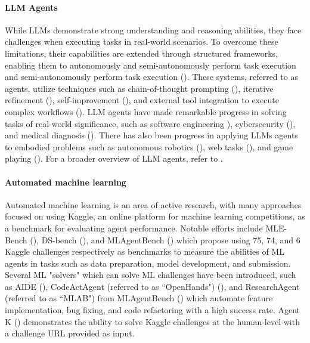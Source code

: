 \documentclass[11pt, a4paper]{gdm_format}
\begin{document}
\paragraph{LLM Agents}
While LLMs demonstrate strong understanding and reasoning abilities, they face challenges when executing tasks in real-world scenarios.
To overcome these limitations, their capabilities are extended through structured frameworks, enabling them to autonomously and semi-autonomously perform task execution and semi-autonomously perform task execution (\cite{wu2023autogen, li2023camel, chen2023agentverse, qian2024chatdev}).
These systems, referred to as agents, utilize techniques such as chain-of-thought prompting (\cite{wei2022chain}), iterative refinement (\cite{shinn2024reflexion}), self-improvement (\cite{huang2022large}), and external tool integration to execute complex workflows (\cite{hao2024toolkengpt, qin2023toolllm, schick2023toolformer}). 
LLM agents have made remarkable progress in solving tasks of real-world significance, such as software engineering \cite{jimenez2023swe, yang2024swe, wang2024opendevin}), cybersecurity (\cite{abramovich2024enigma, wan2024cyberseceval, fang2024llm}), and medical diagnosis (\cite{tu2024towards, schmidgall2024agentclinic, mcduff2023towards}). There has also been progress in applying LLMs agents to embodied problems such as autonomous robotics (\cite{brohan2022rt, kimsurgical, black2024pi_0, brohan2023rt}), web tasks (\cite{gur2023real, putta2024agent, deng2024mind2web, shi2017world, he2024webvoyager}), and game playing (\cite{wang2023voyager, feng2024chessgpt, al2024project}).  For a broader overview of LLM agents, refer to \cite{wang2024survey}. 



\paragraph{Automated machine learning}

Automated machine learning is an area of active research, with many approaches focused on using Kaggle, an online platform for machine learning competitions, as a benchmark for evaluating agent performance. Notable efforts include MLE-Bench (\cite{chan2024mle}), DS-bench (\cite{jing2024dsbench}), and MLAgentBench (\cite{huang2024mlagentbench}) which propose using 75, 74, and 6 Kaggle challenges respectively as benchmarks to measure the abilities of ML agents in tasks such as data preparation, model development, and submission.  Several ML "solvers" which can solve ML challenges have been introduced, such as AIDE (\cite{AIDE}), CodeActAgent (referred to as “OpenHands") (\cite{wang2024opendevin}), and ResearchAgent (referred to as “MLAB") from MLAgentBench (\cite{huang2024mlagentbench}) which automate feature implementation, bug fixing, and code refactoring with a high success rate.
Agent K (\cite{grosnit2024large}) demonstrates the ability to solve Kaggle challenges at the human-level with a challenge URL provided as input. 
\end{document}

